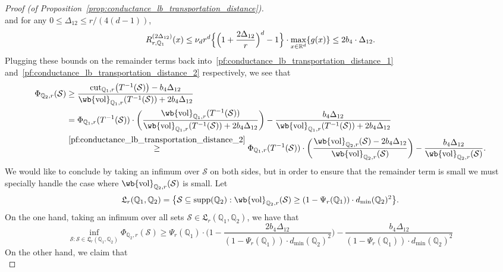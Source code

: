 \documentclass{article}
\newcommand{\Reals}{\mathbb{R}}
\newcommand{\vol}{\mathrm{vol}}
\newcommand{\cut}{\mathrm{cut}}
\newcommand{\1}{\mathbf{1}}
\newcommand{\Rd}{\Reals^d}
\newcommand{\mc}[1]{\mathcal{#1}}
\newcommand{\mbb}[1]{\mathbb{#1}}
\theoremstyle{definition}
\theoremstyle{remark}
\begin{document}
\begin{proof}[Proof (of Proposition~\ref{prop:conductance_lb_transportation_distance})]
\begin{equation*}
	\end{equation*}
	and for any $0 \leq \Delta_{12} \leq r/(4(d - 1))$,
	\begin{equation*}
	R_{r,\mbb{Q}_1}^{(2\Delta_{12})}(x) \leq \nu_dr^d\Bigl\{\Bigl(1 + \frac{2\Delta_{12}}{r}\Bigr)^d - 1\Bigr\} \cdot \max_{x \in \Rd}\{g(x)\} \leq 2 b_4 \cdot \Delta_{12}.
	\end{equation*} 
	Plugging these bounds on the remainder terms back into~\eqref{pf:conductance_lb_transportation_distance_1} and~\eqref{pf:conductance_lb_transportation_distance_2} respectively, we see that
	\begin{align*}
	\Phi_{\mbb{Q}_2,r}(\mc{S}) & \geq \frac{\cut_{\mbb{Q}_1,r}\bigl(T^{-1}(\mc{S})\bigr) - b_4 \Delta_{12}}{\wb{\vol}_{\mbb{Q}_1,r}(T^{-1}(\mc{S})) + 2b_4 \Delta_{12}} \\ & = \Phi_{\mbb{Q}_1,r}(T^{-1}(\mc{S})) \cdot \biggl(\frac{\wb{\vol}_{\mbb{Q}_1,r}(T^{-1}(\mc{S}))}{\wb{\vol}_{\mbb{Q}_1,r}(T^{-1}(\mc{S})) + 2b_4\Delta_{12}}\biggr) - \frac{b_4\Delta_{12}}{\wb{\vol}_{\mbb{Q}_1,r}(T^{-1}(\mc{S})) + 2b_4\Delta_{12}} \\
	& \overset{\eqref{pf:conductance_lb_transportation_distance_2}}{\geq} \Phi_{\mbb{Q}_1,r}(T^{-1}(\mc{S})) \cdot \biggl(\frac{\wb{\vol}_{\mbb{Q}_2,r}(\mc{S}) - 2b_4\Delta_{12}}{\wb{\vol}_{\mbb{Q}_2,r}(\mc{S})}\biggr) - \frac{b_4\Delta_{12}}{\wb{\vol}_{\mbb{Q}_2,r}(\mc{S})}.
	\end{align*}
	We would like to conclude by taking an infimum over $\mc{S}$ on both sides, but in order to ensure that the remainder term is small we must specially handle the case where $\wb{\vol}_{\mbb{Q}_2,r}(\mc{S})$ is small. Let
	\begin{equation*}
	\mathfrak{L}_{r}(\mbb{Q}_1,\mbb{Q}_2) = \bigl\{\mc{S} \subseteq \mathrm{supp}(\mbb{Q}_2): \wb{\vol}_{\mbb{Q}_2,r}(\mc{S}) \geq (1 - \Psi_r(\mbb{Q}_1)) \cdot d_{\min}(\mbb{Q}_2)^2 \bigr\}.
	\end{equation*}
	On the one hand, taking an infimum over all sets $\mc{S} \in \mathfrak{L}_{r}(\mbb{Q}_1,\mbb{Q}_2)$, we have that
	\begin{equation*}
	\inf_{\mc{S}: \mc{S} \in \mathfrak{L}_{r}(\mbb{Q}_1,\mbb{Q}_2)} \Phi_{\mbb{Q}_2,r}(\mc{S}) \geq \Psi_{r}(\mbb{Q}_1) \cdot \biggl(1 - \frac{2 b_4 \Delta_{12}}{(1 - \Psi_r(\mbb{Q}_1)) \cdot d_{\min}(\mbb{Q}_2)^2}\biggr) - \frac{b_4\Delta_{12}}{(1 - \Psi_r(\mbb{Q}_1)) \cdot d_{\min}(\mbb{Q}_2)^2}
	\end{equation*}
	On the other hand, we claim that 
	\begin{equation}

\end{equation}
\end{proof}
\end{document}
